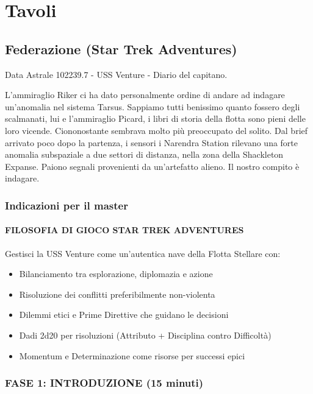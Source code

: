 \documentclass[letterpaper,twocolumn,openany,nodeprecatedcode]{dndbook}
\begin{document}
\part{Tavoli}
\chapter{Federazione (Star Trek Adventures)}

\begin{DndReadAloud}
Data Astrale 102239.7 - USS Venture - Diario del capitano.

L'ammiraglio Riker ci ha dato personalmente ordine di andare ad indagare un'anomalia nel sistema Tarsus. Sappiamo tutti benissimo quanto fossero degli scalmanati, lui e l'ammiraglio Picard, i libri di storia della flotta sono pieni delle loro vicende. Ciononostante sembrava molto più preoccupato del solito. Dal brief arrivato poco dopo la partenza, i sensori i Narendra Station rilevano una forte anomalia subspaziale a due settori di distanza, nella zona della Shackleton Expanse. Paiono segnali provenienti da un'artefatto alieno. Il nostro compito è indagare. 
\end{DndReadAloud}


\section {Indicazioni per il master}
\subsection{FILOSOFIA DI GIOCO STAR TREK ADVENTURES}
Gestisci la USS Venture come un'autentica nave della Flotta Stellare con:

\begin{itemize}
    \item Bilanciamento tra esplorazione, diplomazia e azione
    \item Risoluzione dei conflitti preferibilmente non-violenta
    \item Dilemmi etici e Prime Direttive che guidano le decisioni
    \item Dadi 2d20 per risoluzioni (Attributo + Disciplina contro Difficoltà)
    \item Momentum e Determinazione come risorse per successi epici
\end{itemize}

\section{FASE 1: INTRODUZIONE (15 minuti)}
\end{document}
